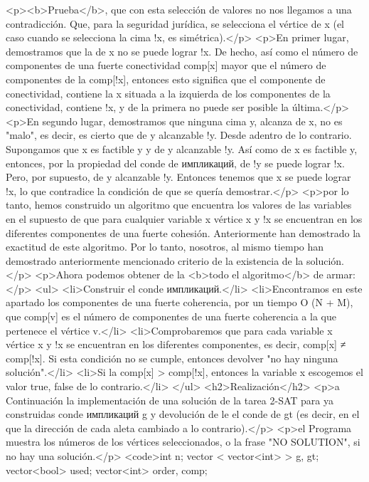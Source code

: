 <p><b>Prueba</b>, que con esta selección de valores no nos llegamos a una contradicción. Que, para la seguridad jurídica, se selecciona el vértice de x (el caso cuando se selecciona la cima !x, es simétrica).</p>
<p>En primer lugar, demostramos que la de x no se puede lograr !x. De hecho, así como el número de componentes de una fuerte conectividad comp[x] mayor que el número de componentes de la comp[!x], entonces esto significa que el componente de conectividad, contiene la x situada a la izquierda de los componentes de la conectividad, contiene !x, y de la primera no puede ser posible la última.</p>
<p>En segundo lugar, demostramos que ninguna cima y, alcanza de x, no es "malo", es decir, es cierto que de y alcanzable !y. Desde adentro de lo contrario. Supongamos que x es factible y y de y alcanzable !y. Así como de x es factible y, entonces, por la propiedad del conde de импликаций, de !y se puede lograr !x. Pero, por supuesto, de y alcanzable !y. Entonces tenemos que x se puede lograr !x, lo que contradice la condición de que se quería demostrar.</p>
<p>por lo tanto, hemos construido un algoritmo que encuentra los valores de las variables en el supuesto de que para cualquier variable x vértice x y !x se encuentran en los diferentes componentes de una fuerte cohesión. Anteriormente han demostrado la exactitud de este algoritmo. Por lo tanto, nosotros, al mismo tiempo han demostrado anteriormente mencionado criterio de la existencia de la solución.</p>
<p>Ahora podemos obtener de la <b>todo el algoritmo</b> de armar:</p>
<ul>
<li>Construir el conde импликаций.</li>
<li>Encontramos en este apartado los componentes de una fuerte coherencia, por un tiempo O (N + M), que comp[v] es el número de componentes de una fuerte coherencia a la que pertenece el vértice v.</li>
<li>Comprobaremos que para cada variable x vértice x y !x se encuentran en los diferentes componentes, es decir, comp[x] ≠ comp[!x]. Si esta condición no se cumple, entonces devolver "no hay ninguna solución".</li>
<li>Si la comp[x] > comp[!x], entonces la variable x escogemos el valor true, false de lo contrario.</li>
</ul>
<h2>Realización</h2>
<p>a Continuación la implementación de una solución de la tarea 2-SAT para ya construidas conde импликаций g y devolución de le el conde de gt (es decir, en el que la dirección de cada aleta cambiado a lo contrario).</p>
<p>el Programa muestra los números de los vértices seleccionados, o la frase "NO SOLUTION", si no hay una solución.</p>
<code>int n;
vector < vector<int> > g, gt;
vector<bool> used;
vector<int> order, comp;

